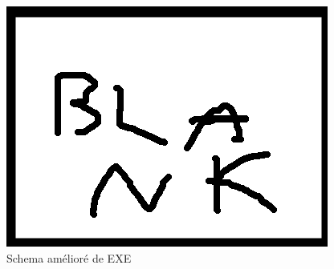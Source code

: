 \documentclass{article}
\begin{document}
\begin{figure}[ht]
\includegraphics[scale=1]{pics/blank.png}
\centering
\caption{Schema amélioré de EXE}
\label{exe2}
\end{figure}


\end{document}
